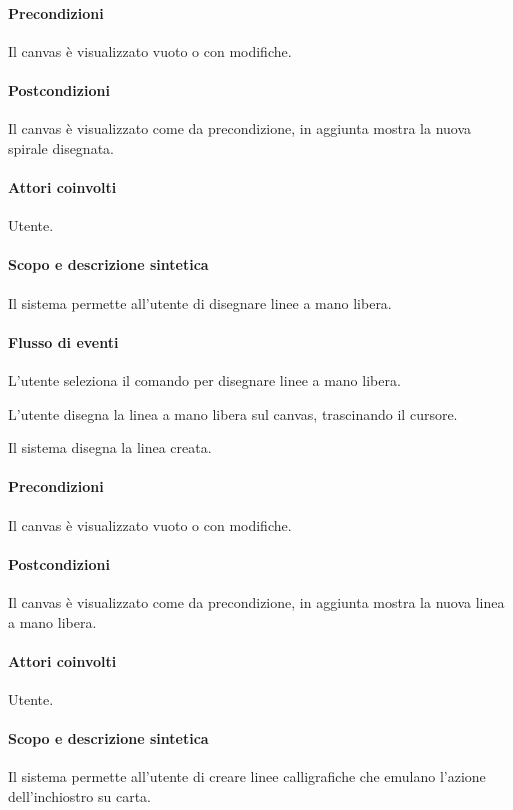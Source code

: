 \paragraph{Precondizioni} Il canvas \`e visualizzato vuoto o con modifiche.
\paragraph{Postcondizioni} Il canvas \`e visualizzato come da precondizione, in aggiunta mostra la nuova spirale disegnata.

\paragraph{Attori coinvolti} Utente.
\paragraph{Scopo e descrizione sintetica} 
Il sistema permette all'utente di disegnare linee a mano libera.
\paragraph{Flusso di eventi}
\begin{elenconumerato}[\textbf{}]{\subsubsecindent}
\item L'utente seleziona il comando per disegnare linee a mano libera.
\item L'utente disegna la linea a mano libera sul canvas, trascinando il cursore.
\item Il sistema disegna la linea creata.
\end{elenconumerato}
\paragraph{Precondizioni} Il canvas \`e visualizzato vuoto o con modifiche.
\paragraph{Postcondizioni} Il canvas \`e visualizzato come da precondizione, in aggiunta mostra la nuova linea a mano libera.

\paragraph{Attori coinvolti} Utente.
\paragraph{Scopo e descrizione sintetica} 
Il sistema permette all'utente di creare linee calligrafiche che emulano l'azione dell'inchiostro su carta.
